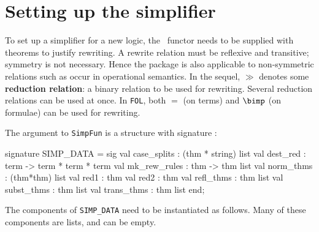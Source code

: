 \section{Setting up the simplifier} \label{SimpFun-input}
To set up a simplifier for a new logic, the \ML\ functor
 needs to be supplied with theorems to justify
rewriting.  A rewrite relation must be reflexive and transitive; symmetry
is not necessary.  Hence the package is also applicable to non-symmetric
relations such as occur in operational semantics.  In the sequel, $\gg$
denotes some {\bf reduction relation}: a binary relation to be used for
rewriting.  Several reduction relations can be used at once.  In {\tt FOL},
both $=$ (on terms) and $\bimp$ (on formulae) can be used for rewriting.

The argument to {\tt SimpFun} is a structure with signature
:
\begin{ttbox}
signature SIMP_DATA =
sig
  val case_splits  : (thm * string) list
  val dest_red     : term -> term * term * term
  val mk_rew_rules : thm -> thm list
  val norm_thms    : (thm*thm) list
  val red1         : thm
  val red2         : thm 
  val refl_thms    : thm list
  val subst_thms   : thm list 
  val trans_thms   : thm list
end;
\end{ttbox}
The components of {\tt SIMP_DATA} need to be instantiated as follows.  Many
of these components are lists, and can be empty.
